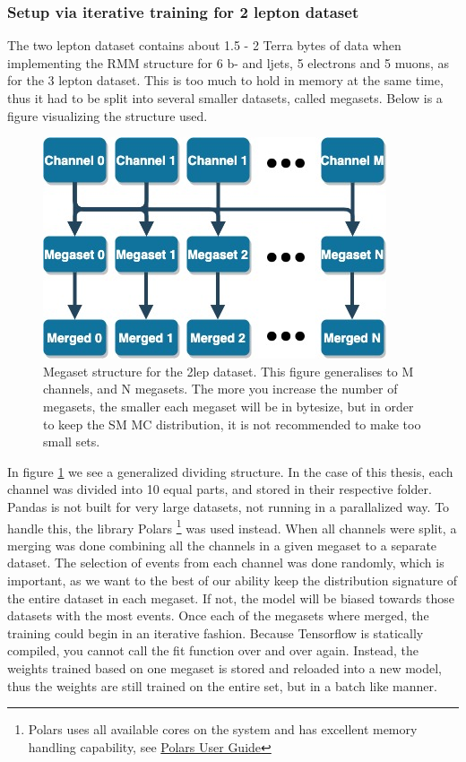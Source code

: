 \subsubsection*{Setup via iterative training for 2 lepton dataset}
The two lepton dataset contains about 1.5 - 2 Terra bytes of data when implementing the RMM structure for 6 
b- and ljets, 5 electrons and 5 muons, as for the 3 lepton dataset. This is too much to hold in memory at the same time, thus it had to 
be split into several smaller datasets, called megasets. Below is a figure visualizing the structure used. 

\begin{figure}
    \centering
    \includegraphics[width=0.6\linewidth]{Figures/2lep_config/megaset_struct.jpeg}
    \caption[Megaset structure diagram]{Megaset structure for the 2lep dataset. This figure generalises to M channels, and N megasets. The more you increase the number of megasets, 
    the smaller each megaset will be in bytesize, but in order to keep the SM MC distribution, it is not recommended to make too small sets.  }
    \label{fig:2lep_struct}
\end{figure}




In figure \ref{fig:2lep_struct} we see a generalized dividing structure. In the case of this thesis, each channel was divided into 10 equal parts, 
and stored in their respective folder. Pandas is not built for very large datasets, not running in a parallalized way. To handle this, the library
Polars
\footnote{Polars uses all available cores on the system and has excellent memory handling capability, see \href{https://pola-rs.github.io/polars-book/user-guide/}{Polars User Guide}}
\cite{ritchie_vink_2023_7744139} was used instead. When all channels were split, a merging was done combining all the channels in a given 
megaset to a separate dataset. The selection of events from each channel was done randomly, 
which is important, as we want to the best of our ability keep the distribution signature of the entire dataset in each megaset. If not, the model will 
be biased towards those datasets with the most events. Once each of the megasets where merged, the training could begin in an iterative fashion. Because
Tensorflow is statically compiled, you cannot call the fit function over and over again. Instead, the weights trained based on one megaset is stored and 
reloaded into a new model, thus the weights are still trained on the entire set, but in a batch like manner. 



